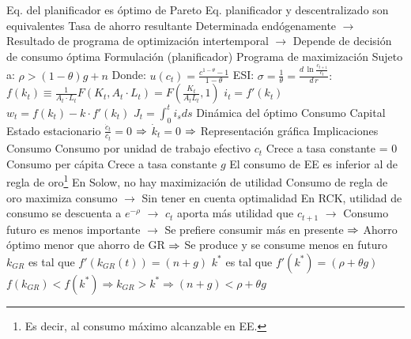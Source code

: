 \documentclass{nuevotema}
\begin{document}
\begin{esquemal}
				\4[] Eq. del planificador es óptimo de Pareto
				\4[$\Rightarrow$] Eq. planificador y descentralizado son equivalentes
				\4 Tasa de ahorro resultante
				\4[] Determinada endógenamente
				\4[] $\to$ Resultado de programa de optimización intertemporal
				\4[] $\to$ Depende de decisión de consumo óptima
		\2 Formulación (planificador)
			\3 Programa de maximización
				\4[]
			\3 Sujeto a:
				\4[] 
				\4[] 
				\4[] 
				\4[] $\rho > (1-\theta)g + n$
			\3 Donde:
				\4[] $u(c_t) = \frac{c^{1-\theta} - 1}{1-\theta}$
				\4[] ESI: $\sigma = \frac{1}{\theta} = \frac{d \, \ln \frac{c_{t+1}}{c_t} }{ d \, r}:$
				\4[] $f(k_t) \equiv \frac{1}{A_t \cdot L_t} F (K_t, A_t \cdot L_t) = F \left( \frac{K_t}{A_t L_t}, 1 \right) $
				\4[] $i_t = f'(k_t)$
				\4[] $w_t = f(k_t) - k\cdot f'(k_t)$
				\4[] $J_t = \int_{0}^{t} i_s ds$
			\3 Dinámica del óptimo
				\4 Consumo
				\4[] 
				\4[] 
				\4 Capital
				\4[] 
				\4[] 
			\3 Estado estacionario
				\4 $\frac{\dot{c}_t}{c_t} = 0$
				\4[] $\Rightarrow$ 
				\4 $\dot{k}_t = 0$
				\4[] $\Rightarrow$ 
				\4 Representación gráfica
				\4[] 
		\2 Implicaciones
			\3 Consumo
				\4 Consumo por unidad de trabajo efectivo $c_t$
				\4[] Crece a tasa constante = 0
				\4 Consumo per cápita
				\4[] Crece a tasa constante $g$
				\4 El consumo de EE es inferior al de regla de oro\footnote{Es decir, al consumo máximo alcanzable en EE.}
				\4[] En Solow, no hay maximización de utilidad
				\4[] Consumo de regla de oro maximiza consumo
				\4[] $\to$ Sin tener en cuenta optimalidad
				\4[] En RCK, utilidad de consumo se descuenta a $e^{-\rho}$
				\4[] $\to$ $c_t$ aporta más utilidad que $c_{t+1}$
				\4[] $\to$ Consumo futuro es menos importante
				\4[] $\to$ Se prefiere consumir más en presente
				\4[] $\Rightarrow$ Ahorro óptimo menor que ahorro de GR
				\4[] $\Rightarrow$ Se produce y se consume menos en futuro
				\4[] $k_{GR}$ es tal que $f'(k_{GR}(t)) = (n+g)$
				\4[] $k^*$ es tal que $f'(k^*) = (\rho + \theta g)$
				\4 $f(k_{GR}) < f(k^*) \Rightarrow k_{GR} > k^* \Rightarrow (n+g) < \rho +\theta g$

\end{esquemal}
\end{document}
